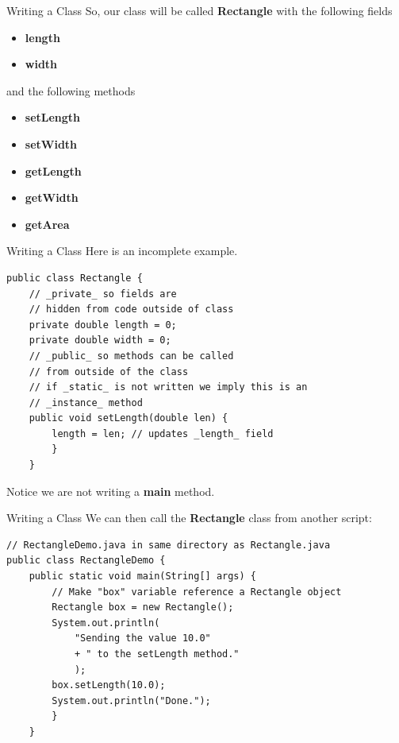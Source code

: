 \documentclass[11pt]{beamer}
\begin{document}
\begin{frame}{Writing a Class}
    So, our class will be called \textbf{Rectangle} with the following fields
    \begin{itemize}
        \item \textbf{length}
        \item \textbf{width}
    \end{itemize}
    and the following methods
    \begin{itemize}
        \item \textbf{setLength}
        \item \textbf{setWidth}
        \item \textbf{getLength}
        \item \textbf{getWidth}
        \item \textbf{getArea}
    \end{itemize}
\end{frame}

\begin{frame}[fragile]{Writing a Class}
Here is an incomplete example.
    \begin{lstlisting}
public class Rectangle {
    // _private_ so fields are
    // hidden from code outside of class
    private double length = 0;
    private double width = 0;
    // _public_ so methods can be called
    // from outside of the class
    // if _static_ is not written we imply this is an
    // _instance_ method
    public void setLength(double len) {
        length = len; // updates _length_ field
        }
    }
    \end{lstlisting}
Notice we are not writing a \textbf{main} method.
\end{frame}

\begin{frame}[fragile]{Writing a Class}
We can then call the \textbf{Rectangle} class from another script:
    \begin{lstlisting}
// RectangleDemo.java in same directory as Rectangle.java
public class RectangleDemo {
    public static void main(String[] args) {
        // Make "box" variable reference a Rectangle object
        Rectangle box = new Rectangle();
        System.out.println(
            "Sending the value 10.0"
            + " to the setLength method."
            );
        box.setLength(10.0);
        System.out.println("Done.");
        }	
    }
    \end{lstlisting}
\end{frame}
\end{document}
